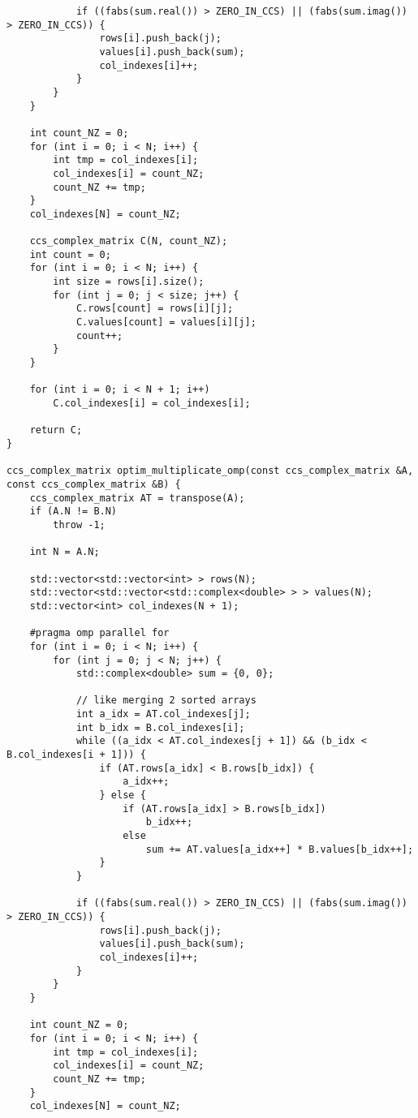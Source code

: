 \documentclass{report}
\begin{document}
\begin{itemize}
\begin{itemize}
\begin{lstlisting}
            if ((fabs(sum.real()) > ZERO_IN_CCS) || (fabs(sum.imag()) > ZERO_IN_CCS)) {
                rows[i].push_back(j);
                values[i].push_back(sum);
                col_indexes[i]++;
            }
        }
    }

    int count_NZ = 0;
    for (int i = 0; i < N; i++) {
        int tmp = col_indexes[i];
        col_indexes[i] = count_NZ;
        count_NZ += tmp;
    }
    col_indexes[N] = count_NZ;

    ccs_complex_matrix C(N, count_NZ);
    int count = 0;
    for (int i = 0; i < N; i++) {
        int size = rows[i].size();
        for (int j = 0; j < size; j++) {
            C.rows[count] = rows[i][j];
            C.values[count] = values[i][j];
            count++;
        }
    }

    for (int i = 0; i < N + 1; i++)
        C.col_indexes[i] = col_indexes[i];

    return C;
}

ccs_complex_matrix optim_multiplicate_omp(const ccs_complex_matrix &A, const ccs_complex_matrix &B) {
    ccs_complex_matrix AT = transpose(A);
    if (A.N != B.N)
        throw -1;

    int N = A.N;

    std::vector<std::vector<int> > rows(N);
    std::vector<std::vector<std::complex<double> > > values(N);
    std::vector<int> col_indexes(N + 1);

    #pragma omp parallel for
    for (int i = 0; i < N; i++) {
        for (int j = 0; j < N; j++) {
            std::complex<double> sum = {0, 0};

            // like merging 2 sorted arrays
            int a_idx = AT.col_indexes[j];
            int b_idx = B.col_indexes[i];
            while ((a_idx < AT.col_indexes[j + 1]) && (b_idx < B.col_indexes[i + 1])) {
                if (AT.rows[a_idx] < B.rows[b_idx]) {
                    a_idx++;
                } else {
                    if (AT.rows[a_idx] > B.rows[b_idx])
                        b_idx++;
                    else
                        sum += AT.values[a_idx++] * B.values[b_idx++];
                }
            }

            if ((fabs(sum.real()) > ZERO_IN_CCS) || (fabs(sum.imag()) > ZERO_IN_CCS)) {
                rows[i].push_back(j);
                values[i].push_back(sum);
                col_indexes[i]++;
            }
        }
    }

    int count_NZ = 0;
    for (int i = 0; i < N; i++) {
        int tmp = col_indexes[i];
        col_indexes[i] = count_NZ;
        count_NZ += tmp;
    }
    col_indexes[N] = count_NZ;


\end{lstlisting}
\end{itemize}
\end{itemize}
\end{document}
